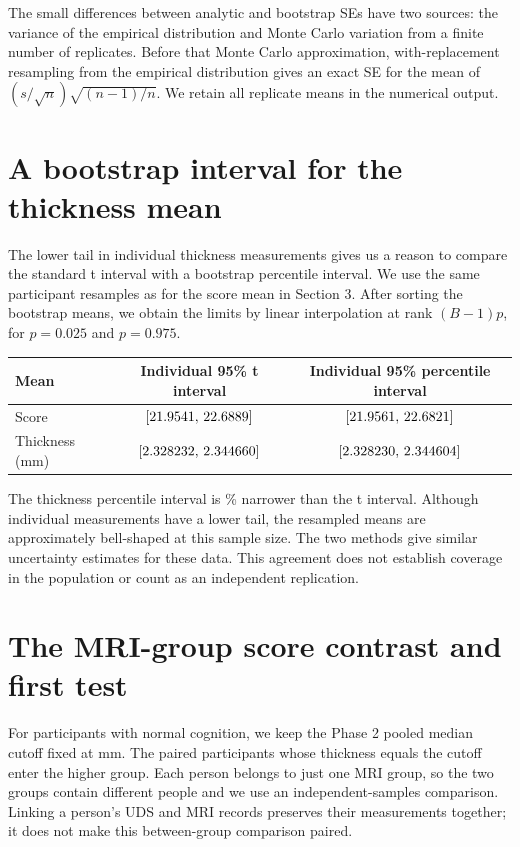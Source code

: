 \documentclass[11pt]{article}
\newcommand{\ci}[2]{\ensuremath{[#1,\,#2]}}
\begin{document}
The small differences between analytic and bootstrap SEs have two sources:
the variance of the empirical distribution and Monte Carlo variation from
a finite number of replicates. Before that Monte Carlo approximation,
with-replacement resampling from the empirical distribution gives an exact
SE for the mean of $(s/\sqrt n)\sqrt{(n-1)/n}$. We retain all replicate
means in the numerical output.

\clearpage
\section{A bootstrap interval for the thickness mean}
The lower tail in individual thickness measurements gives us a reason
to compare the standard t interval with a bootstrap percentile interval.
We use the same participant resamples as for the score mean in Section 3.
After sorting the bootstrap means, we obtain the limits by linear
interpolation at rank $(B-1)p$, for $p=0.025$ and $p=0.975$.

\begin{center}\small
\begin{tabular}{@{}lcc@{}}
\toprule
Mean & Individual 95\% t interval & Individual 95\% percentile interval \\
\midrule
Score & \ci{\ScoreLow}{\ScoreHigh} & \ci{\ScoreBootLow}{\ScoreBootHigh} \\
Thickness (mm) & \ci{\ThicknessLow}{\ThicknessHigh} & \ci{\ThicknessBootLow}{\ThicknessBootHigh} \\
\bottomrule
\end{tabular}
\end{center}


The thickness percentile interval is \ThicknessWidthChange\% narrower
than the t interval. Although individual measurements have a lower tail,
the resampled means are approximately bell-shaped at this sample size.
The two methods give similar uncertainty estimates for these data. This
agreement does not establish coverage in the population or count as an
independent replication.

\clearpage
\section{The MRI-group score contrast and first test}
For participants with normal cognition, we keep the Phase 2 pooled median
cutoff fixed at \ThicknessCut{} mm. The \TiedN{} paired participants whose
thickness equals the cutoff enter the higher group. Each person belongs
to just one MRI group, so the two groups contain different people and
we use an independent-samples comparison. Linking a person's UDS and MRI
records preserves their measurements together; it does not make this
between-group comparison paired.
\end{document}
